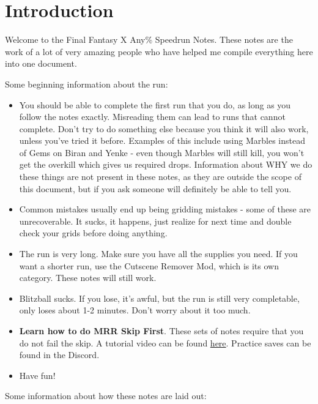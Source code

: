 \chapter{Introduction}

Welcome to the Final Fantasy X Any\% Speedrun Notes. These notes are the work of a lot of very amazing people who have helped me compile everything here into one document.

Some beginning information about the run:

\begin{itemize}
\item You should be able to complete the first run that you do, as long as you follow the notes exactly. Misreading them can lead to runs that cannot complete. Don't try to do something else because you think it will also work, unless you've tried it before. Examples of this include using Marbles instead of Gems on Biran and Yenke - even though Marbles will still kill, you won't get the overkill which gives us required drops. Information about WHY we do these things are not present in these notes, as they are outside the scope of this document, but if you ask someone will definitely be able to tell you.
\item Common mistakes usually end up being gridding mistakes - some of these are unrecoverable. It sucks, it happens, just realize for next time and double check your grids before doing anything.
\item The run is very long. Make sure you have all the supplies you need. If you want a shorter run, use the Cutscene Remover Mod, which is its own category. These notes will still work.
\item Blitzball sucks. If you lose, it's awful, but the run is still very completable, only loses about 1-2 minutes. Don't worry about it too much.
\item \textbf{Learn how to do MRR Skip First}. These sets of notes require that you do not fail the skip. A tutorial video can be found \href{https://www.youtube.com/watch?v=SSnxE6Xzvkk}{here}. Practice saves can be found in the Discord.
\item Have fun!
\end{itemize}

Some information about how these notes are laid out:

